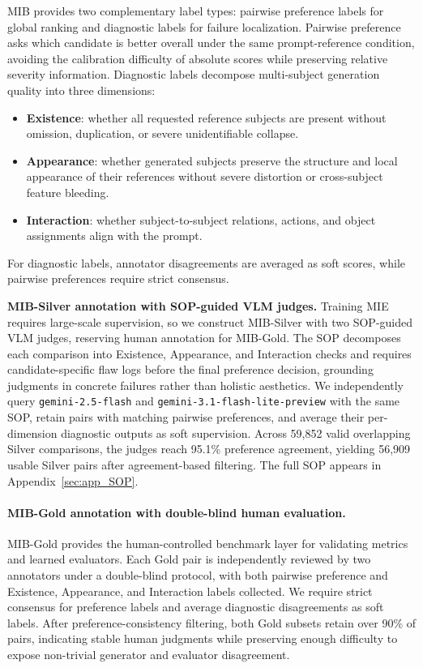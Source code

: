 \documentclass{article}
\begin{document}
MIB provides two complementary label types: pairwise preference labels for global ranking and diagnostic labels for failure localization. Pairwise preference asks which candidate is better overall under the same prompt-reference condition, avoiding the calibration difficulty of absolute scores while preserving relative severity information. Diagnostic labels decompose multi-subject generation quality into three dimensions:
\begin{itemize}
    \item \textbf{Existence}: whether all requested reference subjects are present without omission, duplication, or severe unidentifiable collapse.
    \item \textbf{Appearance}: whether generated subjects preserve the structure and local appearance of their references without severe distortion or cross-subject feature bleeding.
    \item \textbf{Interaction}: whether subject-to-subject relations, actions, and object assignments align with the prompt.
\end{itemize}
For diagnostic labels, annotator disagreements are averaged as soft scores, while pairwise preferences require strict consensus.

\textbf{MIB-Silver annotation with SOP-guided VLM judges.}
Training MIE requires large-scale supervision, so we construct MIB-Silver with two SOP-guided VLM judges, reserving human annotation for MIB-Gold. The SOP decomposes each comparison into Existence, Appearance, and Interaction checks and requires candidate-specific flaw logs before the final preference decision, grounding judgments in concrete failures rather than holistic aesthetics. We independently query \texttt{gemini-2.5-flash} and \texttt{gemini-3.1-flash-lite-preview} with the same SOP, retain pairs with matching pairwise preferences, and average their per-dimension diagnostic outputs as soft supervision. Across 59,852 valid overlapping Silver comparisons, the judges reach 95.1\% preference agreement, yielding 56,909 usable Silver pairs after agreement-based filtering. The full SOP appears in Appendix~\ref{sec:app_SOP}.

\paragraph{MIB-Gold annotation with double-blind human evaluation.}
MIB-Gold provides the human-controlled benchmark layer for validating metrics and learned evaluators. Each Gold pair is independently reviewed by two annotators under a double-blind protocol, with both pairwise preference and Existence, Appearance, and Interaction labels collected. We require strict consensus for preference labels and average diagnostic disagreements as soft labels. After preference-consistency filtering, both Gold subsets retain over 90\% of pairs, indicating stable human judgments while preserving enough difficulty to expose non-trivial generator and evaluator disagreement.
\end{document}
